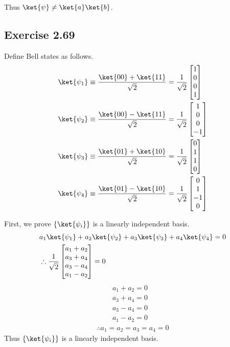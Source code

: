 \documentclass[a4paper,12pt]{article}
\begin{document}
Thus $\ket{\psi} \neq \ket{a} \ket{b}$.


\subsection*{Exercise 2.69}

Define Bell states as follows.
\begin{align*}
    \ket{\psi_1} &\equiv \frac{\ket{00} + \ket{11}}{\sqrt{2}} = \frac{1}{\sqrt{2}} \begin{bmatrix}
    1 \\
    0 \\
    0 \\
    1
    \end{bmatrix} \\
    \ket{\psi_2} &\equiv \frac{\ket{00} - \ket{11}}{\sqrt{2}} = \frac{1}{\sqrt{2}} \begin{bmatrix}
    1 \\
    0 \\
    0 \\
    -1
    \end{bmatrix} \\
    \ket{\psi_3} &\equiv \frac{\ket{01} + \ket{10}}{\sqrt{2}} = \frac{1}{\sqrt{2}} \begin{bmatrix}
    0 \\
    1 \\
    1 \\
    0
    \end{bmatrix} \\
    \ket{\psi_4} &\equiv \frac{\ket{01} - \ket{10}}{\sqrt{2}} = \frac{1}{\sqrt{2}} \begin{bmatrix}
    0 \\
    1 \\
    -1 \\
    0
    \end{bmatrix} \\
\end{align*}

First, we prove $\{\ket{\psi_i} \}$ is a linearly independent basis.
\begin{align*}
    &a_1 \ket{\psi_1} + a_2 \ket{\psi_2} + a_3 \ket{\psi_3} + a_4 \ket{\psi_4} = 0\\
    &\therefore \frac{1}{\sqrt{2}} \begin{bmatrix}
        a_1 + a_2 \\
        a_3 + a_4 \\
        a_3 - a_4 \\
        a_1 - a_2
    \end{bmatrix} = 0
\end{align*}
\begin{align*}
    a_1 + a_2 = 0& \nonumber \\
    a_3+ a_4 = 0& \nonumber \\
    a_3 - a_4 = 0& \nonumber \\
    a_1 - a_2 = 0& \nonumber
\end{align*}
\begin{align*}
    \therefore a_1 = a_2 = a_3 = a_4 = 0
\end{align*}
Thus $\{\ket{\psi_i}\}$ is a linearly independent basis.
\end{document}
